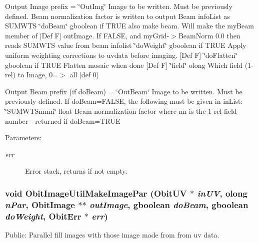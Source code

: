 \begin{Desc}
\begin{description}
Output Image prefix = \char`\"{}Out\-Img\char`\"{} Image to be written. Must be previously defined. Beam normalization factor is written to output Beam info\-List as SUMWTS \char`\"{}do\-Beam\char`\"{} gboolean if TRUE also make beam. Will make the my\-Beam member of [Def F] out\-Image. If FALSE, and my\-Grid-$>$Beam\-Norm 0.0 then reads SUMWTS value from beam infolist \char`\"{}do\-Weight\char`\"{} gboolean if TRUE Apply uniform weighting corrections to uvdata before imaging. [Def F] \char`\"{}do\-Flatten\char`\"{} gboolean if TRUE Flatten mosaic when done [Def F] \char`\"{}field\char`\"{} olong Which field (1-rel) to Image, 0=$>$ all [def 0]\end{description}
\end{Desc}
Output Beam prefix (if do\-Beam) = \char`\"{}Out\-Beam\char`\"{} Image to be written. Must be previously defined. If do\-Beam=FALSE, the following must be given in in\-List: \char`\"{}SUMWTSnnnn\char`\"{} float Beam normalization factor where nn is the 1-rel field number - returned if do\-Beam=TRUE \begin{Desc}
\item[Parameters:]
\begin{description}
\item[{\em err}]Error stack, returns if not empty. \end{description}
\end{Desc}
\subsubsection{\setlength{\rightskip}{0pt plus 5cm}void Obit\-Image\-Util\-Make\-Image\-Par ({\bf Obit\-UV} $\ast$ {\em in\-UV}, {\bf olong} {\em n\-Par}, {\bf Obit\-Image} $\ast$$\ast$ {\em out\-Image}, gboolean {\em do\-Beam}, gboolean {\em do\-Weight}, {\bf Obit\-Err} $\ast$ {\em err})}\label{ObitImageUtil_8c_a8}


Public: Parallel fill images with those image made from from uv data. 

